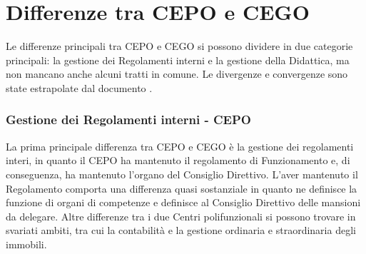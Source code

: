     \section{Differenze tra CEPO e CEGO}
            Le differenze principali tra CEPO e CEGO si possono dividere in due categorie principali: la gestione dei Regolamenti interni e la gestione della Didattica, ma non mancano anche alcuni tratti in comune. \newline
            Le divergenze e convergenze sono state estrapolate dal documento \cite{IstruzioniCEGO-CEPO}. 
        \subsubsection{Gestione dei Regolamenti interni - CEPO}
            La prima principale differenza tra CEPO e CEGO è la gestione dei regolamenti interi, in quanto il CEPO ha mantenuto il regolamento di Funzionamento e, di conseguenza, ha mantenuto l'organo del Consiglio Direttivo. L'aver mantenuto il Regolamento comporta una differenza quasi sostanziale in quanto ne definisce la funzione di organi di competenze e definisce al Consiglio Direttivo delle mansioni da delegare. Altre differenze tra i due Centri polifunzionali si possono trovare in svariati ambiti, tra cui la contabilità e la gestione ordinaria e straordinaria degli immobili. 
